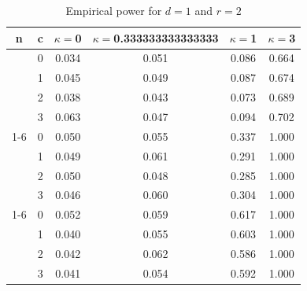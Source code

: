\documentclass[oneside,11pt]{article}
\begin{document}
\begin{table}[H]
\centering
\caption{Empirical power for $d = 1$ and $r = 2$}
\centering
\begin{tabular}[t]{cccccc}
\toprule
n & c & $\kappa = $0 & $\kappa = $0.333333333333333 & $\kappa = $1 & $\kappa = $3\\
\midrule
 & 0 & 0.034 & 0.051 & 0.086 & 0.664\\

 & 1 & 0.045 & 0.049 & 0.087 & 0.674\\

 & 2 & 0.038 & 0.043 & 0.073 & 0.689\\

\multirow{-4}{*}{\centering\arraybackslash 10} & 3 & 0.063 & 0.047 & 0.094 & 0.702\\
\cmidrule{1-6}
 & 0 & 0.050 & 0.055 & 0.337 & 1.000\\

 & 1 & 0.049 & 0.061 & 0.291 & 1.000\\

 & 2 & 0.050 & 0.048 & 0.285 & 1.000\\

\multirow{-4}{*}{\centering\arraybackslash 50} & 3 & 0.046 & 0.060 & 0.304 & 1.000\\
\cmidrule{1-6}
 & 0 & 0.052 & 0.059 & 0.617 & 1.000\\

 & 1 & 0.040 & 0.055 & 0.603 & 1.000\\

 & 2 & 0.042 & 0.062 & 0.586 & 1.000\\

\multirow{-4}{*}{\centering\arraybackslash 100} & 3 & 0.041 & 0.054 & 0.592 & 1.000\\
\bottomrule
\end{tabular}
\end{table}
\end{document}
